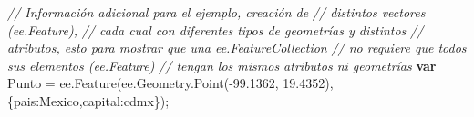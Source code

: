 \documentclass[
  12pt,
  letterpaper,
  twoside]{book}
\newenvironment{Shaded}{\begin{snugshade}}{\end{snugshade}}
\newcommand{\AttributeTok}[1]{\textcolor[rgb]{0.48,0.12,0.64}{#1}}
\newcommand{\CommentTok}[1]{\textcolor[rgb]{0.24,0.58,0.00}{\textit{#1}}}
\newcommand{\DataTypeTok}[1]{\textcolor[rgb]{0.00,0.00,0.00}{#1}}
\newcommand{\FloatTok}[1]{\textcolor[rgb]{0.28,0.53,0.93}{#1}}
\newcommand{\FunctionTok}[1]{\textcolor[rgb]{0.48,0.12,0.64}{#1}}
\newcommand{\KeywordTok}[1]{\textcolor[rgb]{0.00,0.00,0.00}{\textbf{#1}}}
\newcommand{\NormalTok}[1]{#1}
\newcommand{\OperatorTok}[1]{\textcolor[rgb]{0.00,0.00,0.00}{#1}}
\newcommand{\StringTok}[1]{\textcolor[rgb]{0.87,0.29,0.22}{#1}}
\begin{document}
\begin{Shaded}
\begin{Highlighting}[]
\CommentTok{// Información adicional para el ejemplo, creación de }
\CommentTok{// distintos vectores (ee.Feature),}
\CommentTok{// cada cual con diferentes tipos de geometrías y distintos}
\CommentTok{// atributos, esto para mostrar que una ee.FeatureCollection }
\CommentTok{// no requiere que todos sus elementos (ee.Feature)}
\CommentTok{// tengan los mismos atributos ni geometrías}
\KeywordTok{var}\NormalTok{ Punto }\OperatorTok{=}\NormalTok{ ee}\OperatorTok{.}\FunctionTok{Feature}\NormalTok{(ee}\OperatorTok{.}\AttributeTok{Geometry}\OperatorTok{.}\FunctionTok{Point}\NormalTok{(}\OperatorTok{{-}}\FloatTok{99.1362}\OperatorTok{,} \FloatTok{19.4352}\NormalTok{)}\OperatorTok{,}
\NormalTok{    \{}\DataTypeTok{pais}\OperatorTok{:}\StringTok{\textquotesingle{}Mexico\textquotesingle{}}\OperatorTok{,}\DataTypeTok{capital}\OperatorTok{:}\StringTok{\textquotesingle{}cdmx\textquotesingle{}}\NormalTok{\})}\OperatorTok{;}


\end{Highlighting}
\end{Shaded}
\end{document}
